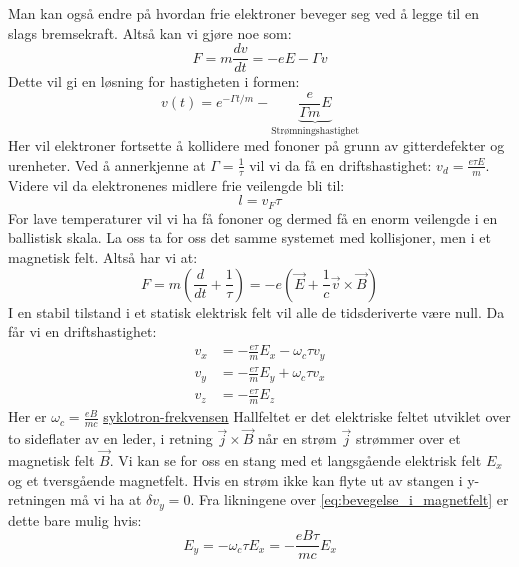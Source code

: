 \documentclass{article}
\begin{document}
Man kan også endre på hvordan frie elektroner beveger seg ved å legge til en slags bremsekraft. Altså kan vi gjøre noe som:
\begin{equation}
    F = m\frac{d v}{dt} = -e E - \Gamma v
\end{equation}
Dette vil gi en løsning for hastigheten i formen:
\begin{equation}
    v(t) = e^{- \Gamma t / m} - \underbrace{\frac{e}{\Gamma m} E}_{\text{Strømningshastighet}}
\end{equation}
Her vil elektroner fortsette å kollidere med fononer på grunn av gitterdefekter og urenheter. Ved å annerkjenne at $\Gamma = \frac{1}{\tau}$ vil vi da få en driftshastighet: $v_d = \frac{e \tau E}{m}$. Videre vil da elektronenes midlere frie veilengde bli til:
\begin{equation}
    l = v_F \tau
\end{equation}
For lave temperaturer vil vi ha få fononer og dermed få en enorm veilengde i en ballistisk skala.
La oss ta for oss det samme systemet med kollisjoner, men i et magnetisk felt. Altså har vi at:
\begin{equation}
    F = m \left(\frac{d}{dt} + \frac{1}{\tau}\right) = -e \left(\vec{E} + \frac{1}{c} \vec{v} \times \vec{B}\right)
\end{equation}
I en stabil tilstand i et statisk elektrisk felt vil alle de tidsderiverte være null. Da får vi en driftshastighet:
\begin{align}
    \label{eq:bevegelse_i_magnetfelt}
    v_x &= -\frac{e \tau}{m} E_x - \omega_c \tau v_y \\
    v_y &= -\frac{e \tau}{m} E_y + \omega_c \tau v_x \\
    v_z &= -\frac{e \tau}{m} E_z
\end{align}
Her er $\omega_c = \frac{e B}{m c}$ \underline{syklotron-frekvensen}
Hallfeltet er det elektriske feltet utviklet over to sideflater av en leder, i retning $\vec{j} \times \vec{B}$ når en strøm $\Vec{j}$ strømmer over et magnetisk felt $\vec{B}$. Vi kan se for oss en stang med et langsgående elektrisk felt $E_x$ og et tversgående magnetfelt. Hvis en strøm ikke kan flyte ut av stangen i y-retningen må vi ha at $\delta v_y = 0$. Fra likningene over \ref{eq:bevegelse_i_magnetfelt} er dette bare mulig hvis:
\begin{equation}
    E_y = - \omega_c \tau  E_x = - \frac{e B \tau}{mc} E_x
\end{equation}
\end{document}
